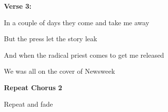 \textbf{Verse 3:}

In a couple of days they come and take me away 

But the press let the story leak

And when the radical priest comes to get me released

We was all on the cover of Newsweek

\textbf{Repeat Chorus 2}

 Repeat and fade

